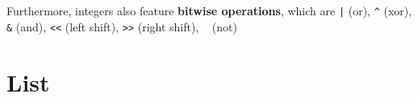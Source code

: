 \documentclass[10pt, openany]{article}
\begin{document}
  Furthermore, integers also feature \textbf{bitwise operations}, 
  which are \texttt{|} (or), \texttt{^} (xor), 
  \texttt{\&} (and), 
  \texttt{<<} (left shift), \texttt{>>} (right shift), 
  \texttt{~} (not) \par

  \section{List}
\end{document}

